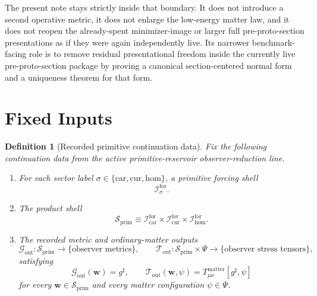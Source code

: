 \documentclass[11pt]{article}
\newcommand{\CompletedMetric}{g^{\sharp}}
\newcommand{\MatterSpace}{\Psi}
\newcommand{\Car}{\mathrm{car}}
\newcommand{\Cur}{\mathrm{cur}}
\newcommand{\Hom}{\mathrm{hom}}
\newcommand{\ForSpace}[1]{\mathcal I_{#1}^{\mathrm{for}}}
\newcommand{\PrimShell}{\mathcal S_{\mathrm{prim}}}
\newcommand{\MetricOut}{\mathscr G_{\mathrm{out}}}
\newcommand{\MatterOut}{\mathscr T_{\mathrm{out}}}
\newtheorem{definition}{Definition}
\begin{document}
The present note stays strictly inside that boundary. It does not introduce a second operative metric, it does not enlarge the low-energy matter law, and it does not reopen the already-spent minimizer-image or larger full pre-proto-section presentations as if they were again independently live. Its narrower benchmark-facing role is to remove residual presentational freedom inside the currently live pre-proto-section package by proving a canonical section-centered normal form and a uniqueness theorem for that form.

\section{Fixed Inputs}

\begin{definition}[Recorded primitive continuation data]
\label{def:fixed}
Fix the following continuation data from the active primitive-reservoir observer-reduction line.
\begin{enumerate}
    \item For each sector label \(\sigma\in\{\Car,\Cur,\Hom\}\), a primitive forcing shell
    \[
    \ForSpace{\sigma}.
    \]
    \item The product shell
    \[
    \PrimShell
    \equiv
    \ForSpace{\Car}\times \ForSpace{\Cur}\times \ForSpace{\Hom}.
    \]
    \item The recorded metric and ordinary-matter outputs
    \[
    \MetricOut:\PrimShell\to\{\text{observer metrics}\},
    \qquad
    \MatterOut:\PrimShell\times\MatterSpace\to\{\text{observer stress tensors}\},
    \]
    satisfying
    \begin{equation}
    \MetricOut(\mathbf w)=\CompletedMetric,
    \qquad
    \MatterOut(\mathbf w,\psi)
    =
    T_{\mu\nu}^{\mathrm{matter}}[\CompletedMetric,\psi]
    \label{eq:fixedoutputs}
    \end{equation}
    for every \(\mathbf w\in\PrimShell\) and every matter configuration \(\psi\in\MatterSpace\).
\end{enumerate}
\end{definition}
\end{document}
